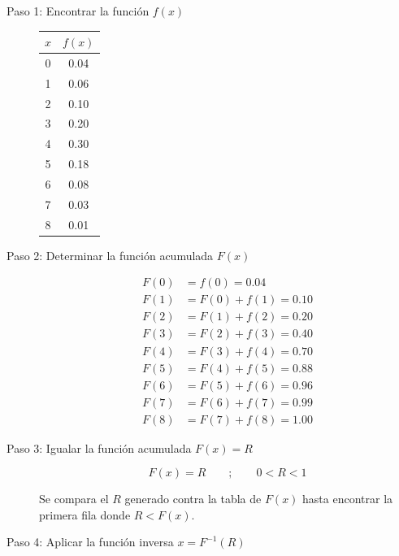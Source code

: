 \begin{description}
    \item[Paso 1: Encontrar la función $f(x)$]

    \begin{center}
    \begin{tabular}{cc}
    \toprule
    $x$ & $f(x)$ \\
    \midrule
    0 & 0.04 \\
    1 & 0.06 \\
    2 & 0.10 \\
    3 & 0.20 \\
    4 & 0.30 \\
    5 & 0.18 \\
    6 & 0.08 \\
    7 & 0.03 \\
    8 & 0.01 \\
    \bottomrule
    \end{tabular}
    \end{center}

    \item[Paso 2: Determinar la función acumulada $F(x)$]

    \begin{align*}
    F(0) &= f(0) = 0.04 \\
    F(1) &= F(0)+f(1) = 0.10 \\
    F(2) &= F(1)+f(2) = 0.20 \\
    F(3) &= F(2)+f(3) = 0.40 \\
    F(4) &= F(3)+f(4) = 0.70 \\
    F(5) &= F(4)+f(5) = 0.88 \\
    F(6) &= F(5)+f(6) = 0.96 \\
    F(7) &= F(6)+f(7) = 0.99 \\
    F(8) &= F(7)+f(8) = 1.00
    \end{align*}

    \item[Paso 3: Igualar la función acumulada $F(x) = R$]

    $$ F(x)=R \qquad ; \qquad 0 < R < 1 $$

    Se compara el $R$ generado contra la tabla de $F(x)$ hasta encontrar la primera fila donde $R < F(x)$.

    \item[Paso 4: Aplicar la función inversa $x=F^{-1}(R)$]


\end{description}
